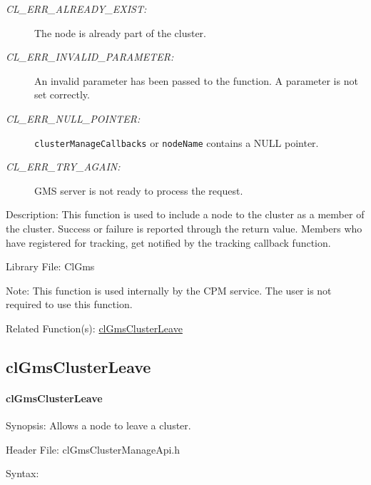 \begin{flushleft}
\begin{Desc}
\begin{description}
\item[{\em CL\_\-ERR\_\-ALREADY\_\-EXIST:}]The node is already part of the cluster.
\item[{\em CL\_\-ERR\_\-INVALID\_\-PARAMETER:}]An invalid parameter has been passed to the function. A parameter is not set correctly.
\item[{\em CL\_\-ERR\_\-NULL\_\-POINTER:}]{\tt{cluster\-Manage\-Callbacks}} or {\tt{node\-Name}} contains a NULL pointer.
\item[{\em CL\_\-ERR\_\-TRY\_\-AGAIN:}] GMS server is not ready to process the request.
\end{description}
\end{Desc}
\begin{Desc}
\item[Description:]This function is used to include a node to the cluster as a member of the cluster. Success or failure is reported through the
return value. Members who have registered for tracking, get notified by the tracking callback function.\end{Desc}
\begin{Desc}
\item[Library File:]Cl\-Gms\end{Desc}
\begin{Desc}
\item[Note:] This function is used internally by the CPM service. The user is not required to use this function.\end{Desc}
\begin{Desc}
\item[Related Function(s):]\hyperlink{pagegms203}{cl\-Gms\-Cluster\-Leave} \end{Desc}
\newpage


\subsection{clGmsClusterLeave}
\hypertarget{pagegms203}{}\paragraph{cl\-Gms\-Cluster\-Leave}\label{pagegms203}
\begin{Desc}
\item[Synopsis:]Allows a node to leave a cluster.\end{Desc}
\begin{Desc}
\item[Header File:]clGmsClusterManageApi.h\end{Desc}
\begin{Desc}
\item[Syntax:]


\end{Desc}
\end{flushleft}
